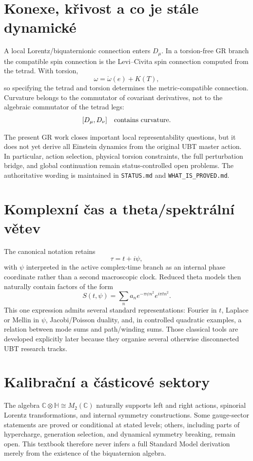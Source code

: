 \section{Konexe, křivost a co je stále dynamické}
A local Lorentz/biquaternionic connection enters $D_\mu$.  In a torsion-free GR
branch the compatible spin connection is the Levi--Civita spin connection
computed from the tetrad.  With torsion,
\[
 \omega=\mathring\omega(e)+K(T),
\]
so specifying the tetrad and torsion determines the metric-compatible
connection.  Curvature belongs to the commutator of covariant derivatives,
not to the algebraic commutator of the tetrad legs:
\[
 [D_\mu,D_\nu]\quad\hbox{contains curvature.}
\]

The present GR work closes important local representability questions, but it
does not yet derive all Einstein dynamics from the original UBT master action.
In particular, action selection, physical torsion constraints, the full
perturbation bridge, and global continuation remain status-controlled open
problems.  The authoritative wording is maintained in
\texttt{STATUS.md} and \texttt{WHAT\_IS\_PROVED.md}.

\section{Komplexní čas a theta/spektrální větev}
The canonical notation retains
\[
 \tau=t+i\psi,
\]
with $\psi$ interpreted in the active complex-time branch as an internal phase
coordinate rather than a second macroscopic clock.  Reduced theta models then
naturally contain factors of the form
\[
 S(t,\psi)=\sum_n a_n e^{-\pi\psi n^2}e^{i\pi t n^2}.
\]
This one expression admits several standard representations: Fourier in $t$,
Laplace or Mellin in $\psi$, Jacobi/Poisson duality, and, in controlled
quadratic examples, a relation between mode sums and path/winding sums.  Those
classical tools are developed explicitly later because they organise several
otherwise disconnected UBT research tracks.

\section{Kalibrační a částicové sektory}
The algebra $\mathbb C\otimes\mathbb H\cong M_2(\mathbb C)$ naturally supports
left and right actions, spinorial Lorentz transformations, and internal
symmetry constructions.  Some gauge-sector statements are proved or
conditional at stated levels; others, including parts of hypercharge,
generation selection, and dynamical symmetry breaking, remain open.  This
textbook therefore never infers a full Standard Model derivation merely from
the existence of the biquaternion algebra.

